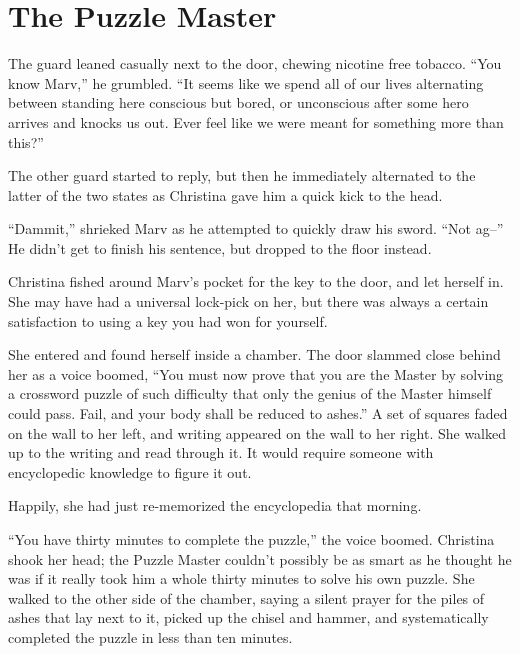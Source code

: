 \documentclass[showtrims,b6paper,draft,10pt]{memoir}
\begin{document}
\newcommand{\timeskip}{\begin{center}* * *\end{center}}

\chapter{The Puzzle Master}

The guard leaned casually next to the door, chewing nicotine free tobacco.  “You know Marv,” he grumbled.  “It seems like we spend all of our lives alternating between standing here conscious but bored, or unconscious after some hero arrives and knocks us out.  Ever feel like we were meant for something more than this?”

The other guard started to reply, but then he immediately alternated to the latter of the two states as Christina gave him a quick kick to the head.

``Dammit,'' shrieked Marv as he attempted to quickly draw his sword.  ``Not ag--''  He didn’t get to finish his sentence, but dropped to the floor instead.

Christina fished around Marv’s pocket for the key to the door, and let herself in.  She may have had a universal lock-pick on her, but there was always a certain satisfaction to using a key you had won for yourself.

She entered and found herself inside a chamber.  The door slammed close behind her as a voice boomed, ``You must now prove that you are the Master by solving a crossword puzzle of such difficulty that only the genius of the Master himself could pass.  Fail, and your body shall be reduced to ashes.''  A set of squares faded on the wall to her left, and writing appeared on the wall to her right.  She walked up to the writing and read through it.  It would require someone with encyclopedic knowledge to figure it out.

Happily, she had just re-memorized the encyclopedia that morning.

``You have thirty minutes to complete the puzzle,'' the voice boomed.  Christina shook her head;  the Puzzle Master couldn’t possibly be as smart as he thought he was if it really took him a whole thirty minutes to solve his own puzzle.  She walked to the other side of the chamber, saying a silent prayer for the piles of ashes that lay next to it, picked up the chisel and hammer, and systematically completed the puzzle in less than ten minutes.
\end{document}
